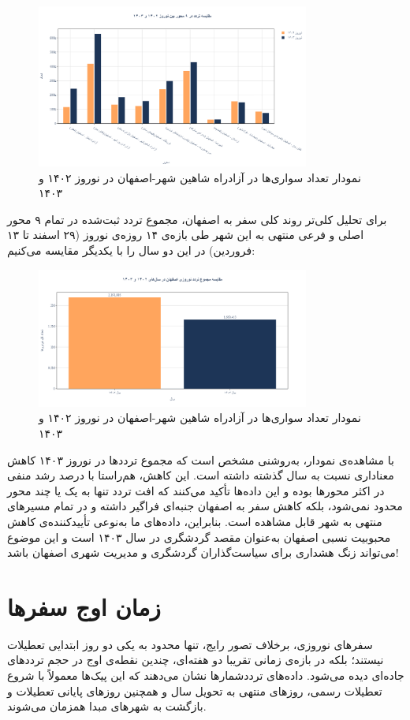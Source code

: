 \documentclass[a4paper, 12pt]{article}
\begin{document}
\begin{figure}[htbp]
    \centering
    \includegraphics[width=0.8\textwidth]{pics/isfahan/isfahan_all_roads.png}
    \caption{نمودار تعداد سواری‌ها در آزادراه شاهین شهر-اصفهان در نوروز ۱۴۰۲ و ۱۴۰۳}
\end{figure}

\newpage
برای تحلیل کلی‌تر روند کلی سفر به اصفهان، مجموع تردد ثبت‌شده در تمام ۹ محور اصلی و فرعی منتهی به این شهر طی بازه‌ی ۱۴ روزه‌ی نوروز (۲۹ اسفند تا ۱۳ فروردین) در این دو سال را با یکدیگر مقایسه می‌کنیم:
\begin{figure}[htbp]
    \centering
    \includegraphics[width=0.8\textwidth]{pics/isfahan/all_isf.png}
    \caption{نمودار تعداد سواری‌ها در آزادراه شاهین شهر-اصفهان در نوروز ۱۴۰۲ و ۱۴۰۳}
\end{figure}
با مشاهده‌ی نمودار، به‌روشنی مشخص است که مجموع ترددها در نوروز ۱۴۰۳ کاهش معناداری نسبت به سال گذشته داشته است. این کاهش، هم‌راستا با درصد رشد منفی در اکثر محورها بوده و این داده‌ها تأکید می‌کنند که افت تردد تنها به یک یا چند محور محدود نمی‌شود، بلکه کاهش سفر به اصفهان جنبه‌ای فراگیر داشته و در تمام مسیرهای منتهی به شهر قابل مشاهده است. بنابراین، داده‌های ما به‌نوعی تأییدکننده‌ی کاهش محبوبیت نسبی اصفهان به‌عنوان مقصد گردشگری در سال ۱۴۰۳ است و این موضوع می‌تواند زنگ هشداری برای سیاست‌گذاران گردشگری و مدیریت شهری اصفهان باشد!

\newpage
\section{زمان اوج سفرها}
سفرهای نوروزی، برخلاف تصور رایج، تنها محدود به یکی دو روز ابتدایی تعطیلات نیستند؛ بلکه در بازه‌ی زمانی تقریبا دو هفته‌ای، چندین نقطه‌ی اوج در حجم ترددهای جاده‌ای دیده می‌شود. داده‌های ترددشمارها نشان می‌دهند که این پیک‌ها معمولاً با شروع تعطیلات رسمی، روزهای منتهی به تحویل سال و همچنین روزهای پایانی تعطیلات و بازگشت به شهرهای مبدا همزمان می‌شوند.
\end{document}
